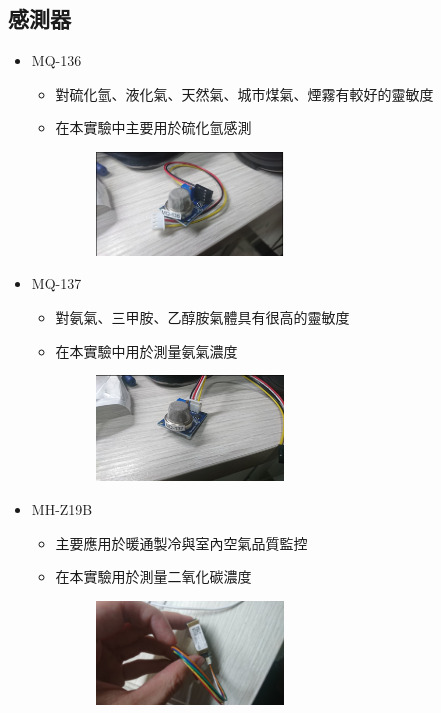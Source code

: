 	\subsection{感測器}
	\begin{itemize}
		\item MQ-136 \begin{itemize}
			\item 對硫化氫、液化氣、天然氣、城市煤氣、煙霧有較好的靈敏度
			\item 在本實驗中主要用於硫化氫感測
			\begin{figure}[H]
				\centering
				\includegraphics[width=0.5\textwidth]{../../pic/mq-136.png}
			\end{figure}
		\end{itemize}
		\item MQ-137 \begin{itemize}
			\item 對氨氣、三甲胺、乙醇胺氣體具有很高的靈敏度
			\item 在本實驗中用於測量氨氣濃度
			\begin{figure}[H]
				\centering
				\includegraphics[width=0.5\textwidth]{../../pic/mq-137.png}
			\end{figure}
		\end{itemize}
		\item MH-Z19B \begin{itemize}
			\item 主要應用於暖通製冷與室內空氣品質監控
			\item 在本實驗用於測量二氧化碳濃度
			\begin{figure}[H]
				\centering
				\includegraphics[width=0.5\textwidth]{../../pic/mh-z19B.png}
			\end{figure}
		\end{itemize}
	\end{itemize}
